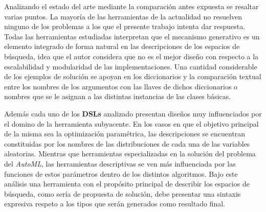 








Analizando el estado del arte mediante la comparación antes expuesta se
resaltar varias puntos. La mayoría de las herramientas de la actualidad
no resuelven ninguno de los problemas a los que el presente trabajo intenta
dar respuesta. Todas las herramientas estudiadas interpretan que el mecanismo
generativo es un elemento integrado de forma natural en las descripciones de
los espacios de búsqueda, idea que el autor considera que no es el mejor
diseño con respecto a la escalabilidad y modularidad de las implementaciones.
Una cantidad considerable de los ejemplos de solución se apoyan en los diccionarios
y la comparación textual entre los nombres de los argumentos con las llaves
de dichos diccionarios o nombres que se le asignan a las distintas instancias de
las clases básicas.

Además cada uno de los {\bf DSLs} analizado presentan diseños muy influenciados
por el domino de la herramienta subyacente. En los casos en que el objetivo
principal de la misma sea la optimización paramétrica, las descripciones se
encuentran constituidas por los nombres de las distribuciones de cada una de
las variables aleatorias. Mientras que herramientas especializadas en la solución
del problema del {\it AutoML}, las herramientas descriptivas se ven más influenciada
por las funciones de estos parámetros dentro de los distintos algoritmos. Bajo este
análisis una herramienta con el propósito principal de describir los espacios de
búsqueda, como sería de propuesta de solución, debe presentar una sintaxis expresiva
respeto a los tipos que serán generados como resultado final.


